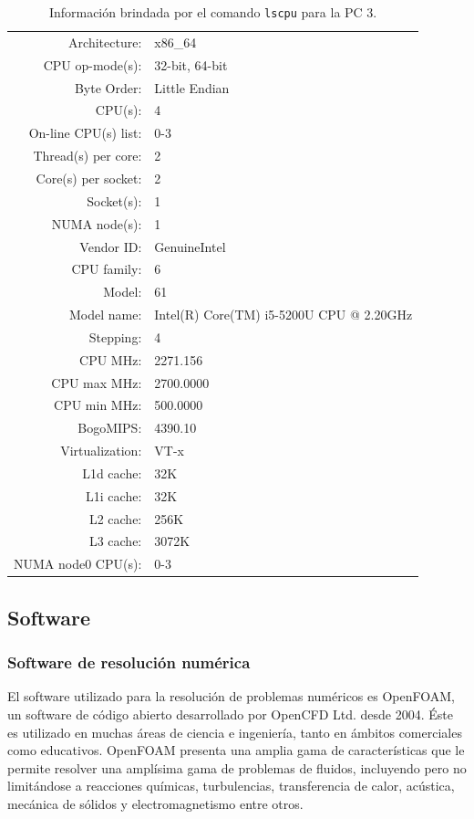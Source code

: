 \documentclass{article}
\begin{document}
\begin{description}[align=right]
        \begin{table}[H]
            \centering
            \begin{tabular}{ r l }
				Architecture:        &  x86\_64\\
				CPU op-mode(s):      &  32-bit, 64-bit\\
				Byte Order:          &  Little Endian\\
				CPU(s):              &  4\\
				On-line CPU(s) list: &  0-3\\
				Thread(s) per core:  &  2\\
				Core(s) per socket:  &  2\\
				Socket(s):           &  1\\
				NUMA node(s):        &  1\\
				Vendor ID:           &  GenuineIntel\\
				CPU family:          &  6\\
				Model:               &  61\\
				Model name:          &  Intel(R) Core(TM) i5-5200U CPU @ 2.20GHz\\
				Stepping:            &  4\\
				CPU MHz:             &  2271.156\\
				CPU max MHz:         &  2700.0000\\
				CPU min MHz:         &  500.0000\\
				BogoMIPS:            &  4390.10\\
				Virtualization:      &  VT-x\\
				L1d cache:           &  32K\\
				L1i cache:           &  32K\\
				L2 cache:            &  256K\\
				L3 cache:            &  3072K\\
				NUMA node0 CPU(s):   &  0-3\\
            \end{tabular}
            \caption{Información brindada por el comando \texttt{lscpu} para la PC 3.}
        \end{table}
\end{description}
\subsection{Software}
\subsubsection{Software de resolución numérica}
El software utilizado para la resolución de problemas numéricos es OpenFOAM, un software de código abierto desarrollado por OpenCFD Ltd. desde 2004. Éste es utilizado en muchas áreas de ciencia e ingeniería, tanto en ámbitos comerciales como educativos. OpenFOAM presenta una amplia gama de características que le permite resolver una amplísima gama de problemas de fluidos, incluyendo pero no limitándose a reacciones químicas, turbulencias, transferencia de calor, acústica, mecánica de sólidos y electromagnetismo entre otros. 
\end{document}
